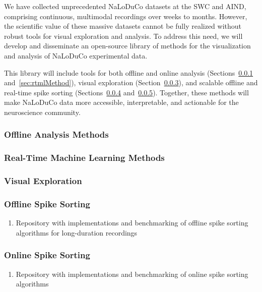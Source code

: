 We have collected unprecedented NaLoDuCo datasets at the SWC and AIND,
comprising continuous, multimodal recordings over weeks to months. However, the
scientific value of these massive datasets cannot be fully realized without
robust tools for visual exploration and analysis. To address this need, we will
develop and disseminate an open-source library of methods for the visualization
and analysis of NaLoDuCo experimental data.

This library will include tools for both offline and online analysis
(Sections~\ref{sec:offlineAnalysisMethods}
and~\ref{sec:rtmlMethod}), visual exploration
(Section~\ref{sec:visualExploration}), and scalable offline and real-time spike
sorting (Sections~\ref{sec:offlineSpikeSorting}
and~\ref{sec:onlineSpikeSorting}). Together, these methods will make NaLoDuCo
data more accessible, interpretable, and actionable for the neuroscience
community.

\subsubsection{Offline Analysis Methods}
\label{sec:offlineAnalysisMethods}



\subsubsection{Real-Time Machine Learning Methods}
\label{sec:rtmlMethods}



\subsubsection{Visual Exploration}
\label{sec:visualExploration}



\subsubsection{Offline Spike Sorting}
\label{sec:offlineSpikeSorting}


\begin{enumerate}

    \item Repository with implementations and benchmarking of offline spike
        sorting algorithms for long-duration recordings

\end{enumerate}

\subsubsection{Online Spike Sorting}
\label{sec:onlineSpikeSorting}


\begin{enumerate}

    \item Repository with implementations and benchmarking of online spike
        sorting algorithms

\end{enumerate}

